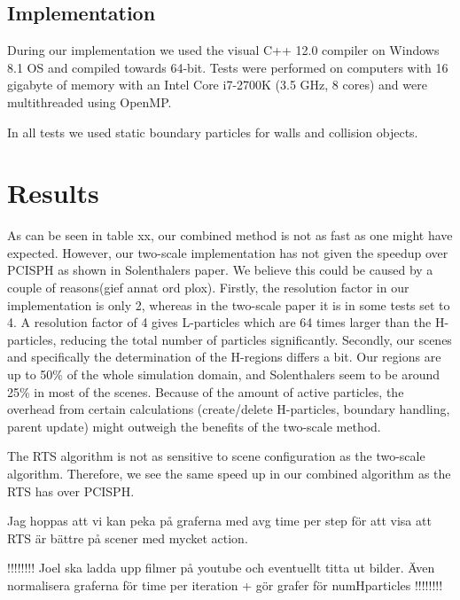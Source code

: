 \documentclass[../../main.tex]{subfiles}
\begin{document}
\tracingall



\subsection{Implementation}
During our implementation we used the visual C++ 12.0 compiler on Windows 8.1 OS and compiled towards 64-bit. Tests were performed on computers with 16 gigabyte of memory with an Intel Core i7-2700K (3.5 GHz, 8 cores) and were multithreaded using OpenMP. 

In all tests we used static boundary particles for walls and collision objects. %


\section{Results}

As can be seen in table xx, our combined method is not as fast as one might have expected. However, our two-scale implementation has not given the speedup over PCISPH as shown in Solenthalers paper. We believe this could be caused by a couple of reasons(gief annat ord plox). Firstly, the resolution factor in our implementation is only 2, whereas in the two-scale paper it is in some tests set to 4. A resolution factor of 4 gives L-particles which are 64 times larger than the H-particles, reducing the total number of particles significantly. Secondly, our scenes and specifically the determination of the H-regions differs a bit. Our regions are up to 50\% of the whole simulation domain, and Solenthalers seem to be around 25\% in most of the scenes. Because of the amount of active particles, the overhead from certain calculations (create/delete H-particles, boundary handling, parent update) might outweigh the benefits of the two-scale method. 

The RTS algorithm is not as sensitive to scene configuration as the two-scale algorithm. Therefore, we see the same speed up in our combined algorithm as the RTS has over PCISPH. 

Jag hoppas att vi kan peka på graferna med avg time per step för att visa att RTS är bättre på scener med mycket action. 


!!!!!!!! Joel ska ladda upp filmer på youtube och eventuellt titta ut bilder. Även normalisera graferna för time per iteration + gör grafer för numHparticles !!!!!!!!
\end{document}
